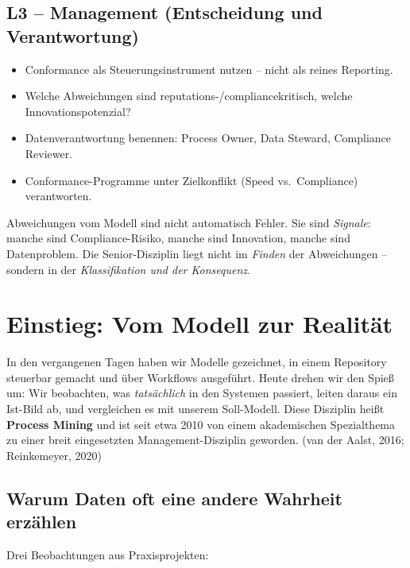 \documentclass[11pt,a4paper,oneside]{article}
\newcommand{\fachbegriff}[1]{\textbf{#1}}
\newcommand{\quelle}[1]{{\footnotesize\color{lpGray}(#1)}}
\begin{document}
\subsection*{L3 -- Management (Entscheidung und Verantwortung)}
\begin{itemize}
  \item Conformance als Steuerungsinstrument nutzen -- nicht als reines Reporting.
  \item Welche Abweichungen sind reputations-/compliancekritisch, welche Innovationspotenzial?
  \item Datenverantwortung benennen: Process Owner, Data Steward, Compliance Reviewer.
  \item Conformance-Programme unter Zielkonflikt (Speed vs.\ Compliance) verantworten.
\end{itemize}

\begin{merkbox}
Abweichungen vom Modell sind nicht automatisch Fehler. Sie sind \emph{Signale}: manche sind Compliance-Risiko, manche sind Innovation, manche sind Datenproblem. Die Senior-Disziplin liegt nicht im \emph{Finden} der Abweichungen -- sondern in der \emph{Klassifikation und der Konsequenz}.
\end{merkbox}

\clearpage

\section{Einstieg: Vom Modell zur Realität}

In den vergangenen Tagen haben wir Modelle gezeichnet, in einem Repository steuerbar gemacht und über Workflows ausgeführt. Heute drehen wir den Spieß um: Wir beobachten, was \emph{tatsächlich} in den Systemen passiert, leiten daraus ein Ist-Bild ab, und vergleichen es mit unserem Soll-Modell. Diese Disziplin heißt \fachbegriff{Process Mining} und ist seit etwa 2010 von einem akademischen Spezialthema zu einer breit eingesetzten Management-Disziplin geworden. \quelle{van der Aalst, 2016; Reinkemeyer, 2020}

\subsection{Warum Daten oft eine andere Wahrheit erzählen}

Drei Beobachtungen aus Praxisprojekten:
\end{document}

